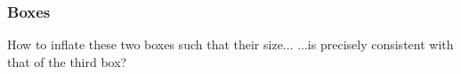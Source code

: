\documentclass{beamer}
\begin{document}
\begin{frame}
\frametitle{Boxes}
    \begin{block}{How to inflate these two boxes such that their size...}
        ...is precisely consistent with that of the third box?
    \end{block}
\end{frame}
\end{document}
